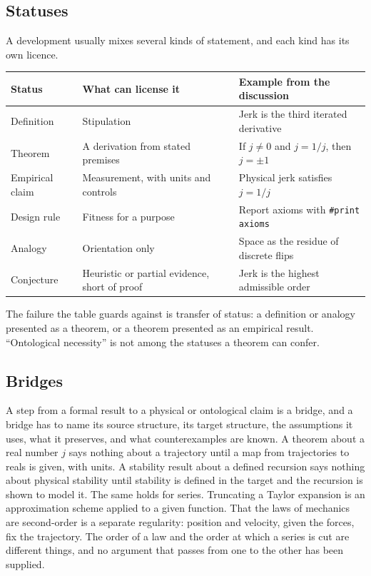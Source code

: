 \documentclass[11pt]{article}
\begin{document}
\subsection{Statuses}

A development usually mixes several kinds of statement, and each kind has its own licence.

\begin{center}
\small
\begin{tabular}{@{}>{\raggedright\arraybackslash}p{}>{\raggedright\arraybackslash}p{}>{\raggedright\arraybackslash}p{}@{}}
\toprule
Status & What can license it & Example from the discussion \\
\midrule
Definition & Stipulation & Jerk is the third iterated derivative \\
Theorem & A derivation from stated premises & If $j\neq0$ and $j=1/j$, then $j=\pm1$ \\
Empirical claim & Measurement, with units and controls & Physical jerk satisfies $j=1/j$ \\
Design rule & Fitness for a purpose & Report axioms with \texttt{\#print axioms} \\
Analogy & Orientation only & Space as the residue of discrete flips \\
Conjecture & Heuristic or partial evidence, short of proof & Jerk is the highest admissible order \\
\bottomrule
\end{tabular}
\end{center}

The failure the table guards against is transfer of status: a definition or analogy presented as a theorem, or a theorem presented as an empirical result. ``Ontological necessity'' is not among the statuses a theorem can confer.

\subsection{Bridges}

A step from a formal result to a physical or ontological claim is a bridge, and a bridge has to name its source structure, its target structure, the assumptions it uses, what it preserves, and what counterexamples are known. A theorem about a real number $j$ says nothing about a trajectory until a map from trajectories to reals is given, with units. A stability result about a defined recursion says nothing about physical stability until stability is defined in the target and the recursion is shown to model it. The same holds for series. Truncating a Taylor expansion is an approximation scheme applied to a given function. That the laws of mechanics are second-order is a separate regularity: position and velocity, given the forces, fix the trajectory. The order of a law and the order at which a series is cut are different things, and no argument that passes from one to the other has been supplied.
\end{document}

